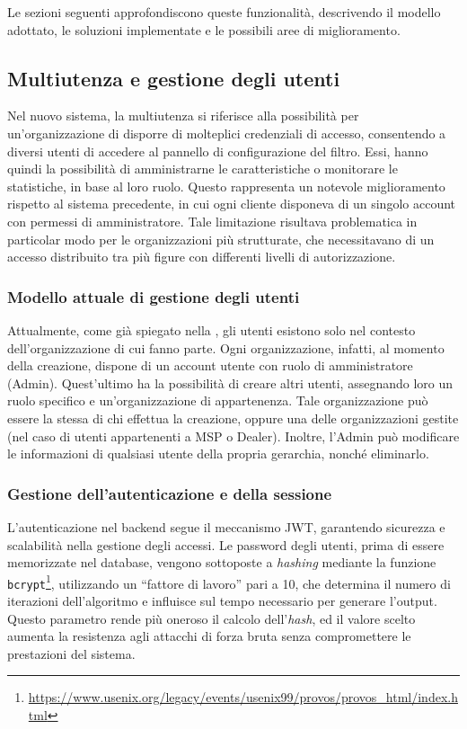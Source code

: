 Le sezioni seguenti approfondiscono queste funzionalità, descrivendo il modello adottato, le soluzioni implementate e le possibili aree di miglioramento.

\subsection{Multiutenza e gestione degli utenti}
Nel nuovo sistema, la multiutenza si riferisce alla possibilità per un'organizzazione di disporre di molteplici credenziali di accesso, consentendo a diversi utenti di accedere al pannello di configurazione del filtro. Essi, hanno quindi la possibilità di amministrarne le caratteristiche o monitorare le statistiche, in base al loro ruolo. Questo rappresenta un notevole miglioramento rispetto al sistema precedente, in cui ogni cliente disponeva di un singolo account con permessi di amministratore. Tale limitazione risultava problematica in particolar modo per le organizzazioni più strutturate, che necessitavano di un accesso distribuito tra più figure con differenti livelli di autorizzazione.

\subsubsection{Modello attuale di gestione degli utenti}
Attualmente, come già spiegato nella , gli utenti esistono solo nel contesto dell'organizzazione di cui fanno parte. Ogni organizzazione, infatti, al momento della creazione, dispone di un account utente con ruolo di amministratore (Admin). Quest'ultimo ha la possibilità di creare altri utenti, assegnando loro un ruolo specifico e un'organizzazione di appartenenza. Tale organizzazione può essere la stessa di chi effettua la creazione, oppure una delle organizzazioni gestite (nel caso di utenti appartenenti a MSP o Dealer). Inoltre, l'Admin può modificare le informazioni di qualsiasi utente della propria gerarchia, nonché eliminarlo.

\subsubsection{Gestione dell'autenticazione e della sessione}
L'autenticazione nel backend segue il meccanismo JWT, garantendo sicurezza e scalabilità nella gestione degli accessi. Le password degli utenti, prima di essere memorizzate nel database, vengono sottoposte a \textit{hashing} mediante la funzione \texttt{bcrypt}\footnote{\url{https://www.usenix.org/legacy/events/usenix99/provos/provos_html/index.html}}, utilizzando un ``fattore di lavoro'' pari a 10, che determina il numero di iterazioni dell'algoritmo e influisce sul tempo necessario per generare l'output. Questo parametro rende più oneroso il calcolo dell'\textit{hash}, ed il valore scelto aumenta la resistenza agli attacchi di forza bruta senza compromettere le prestazioni del sistema.

